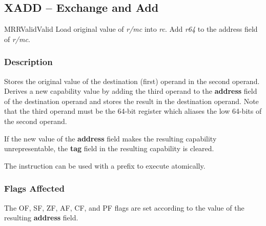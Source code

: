 \clearpage
{}
{}
\subsection*{XADD -- Exchange and Add}

\begin{x86opcodetable}
  {MRR}{Valid}{Valid}
  {Load original value of \emph{r/mc} into \emph{rc}.  Add \emph{r64}
    to the address field of \emph{r/mc}.}
\end{x86opcodetable}

\begin{x86opentable}
\end{x86opentable}

\subsubsection*{Description}

Stores the original value of the destination (first) operand in the second
operand.  Derives a new capability value by adding the third operand
to the \textbf{address} field of the destination operand and stores
the result in the destination operand.  Note that the third operand
must be the 64-bit register which aliases the low 64-bits of the
second operand.

If the new value of the \textbf{address} field makes the resulting
capability unrepresentable, the \textbf{tag} field in the resulting
capability is cleared.

The instruction can be used with a  prefix to execute
atomically.

\subsubsection*{Flags Affected}

The OF, SF, ZF, AF, CF, and PF flags are set according to the value of
the resulting \textbf{address} field.
